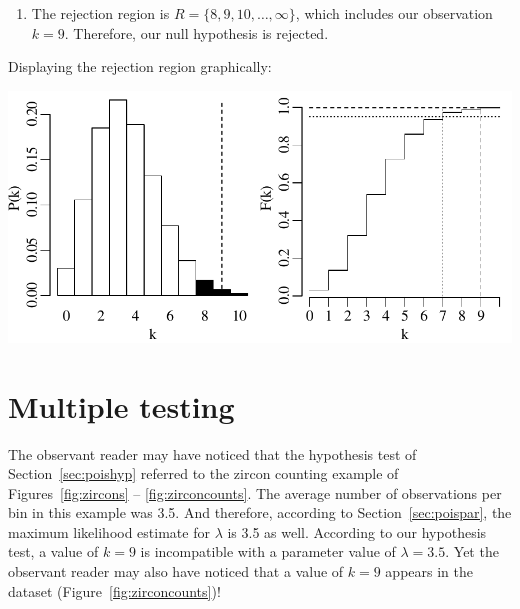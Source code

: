 \begin{enumerate}
\item\label{it:poisl351sided} The rejection region is $R =
  \{8,9,10,\ldots,\infty\}$, which includes our observation
  $k=9$. Therefore, our null hypothesis is rejected.

\end{enumerate}

Displaying the rejection region graphically:

\noindent\begin{minipage}[t][][b]{.6\textwidth}
  \includegraphics[width=\textwidth]{../figures/poishyp.pdf}\medskip
\end{minipage}
\begin{minipage}[t][][t]{.4\textwidth}
  \label{fig:poishyp}
\end{minipage}

\section{Multiple testing}
\label{sec:multipletesting}

The observant reader may have noticed that the hypothesis test of
Section~\ref{sec:poishyp} referred to the zircon counting example of
Figures~\ref{fig:zircons} -- \ref{fig:zirconcounts}. The average
number of observations per bin in this example was 3.5. And therefore,
according to Section~\ref{sec:poispar}, the maximum likelihood
estimate for $\lambda$ is 3.5 as well. According to our hypothesis
test, a value of $k=9$ is incompatible with a parameter value of
$\lambda=3.5$. Yet the observant reader may also have noticed that a
value of $k=9$ appears in the dataset
(Figure~\ref{fig:zirconcounts})!\medskip

